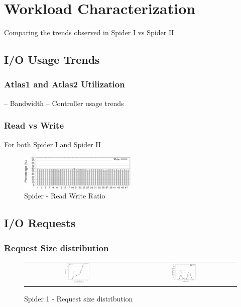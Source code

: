 \section{Workload Characterization}
\label{sec:workloadchar}

Comparing the trends observed in Spider I vs Spider II

\subsection{I/O Usage Trends}
\subsubsection{Atlas1 and Atlas2 Utilization}
-- Bandwidth
-- Controller usage trends

\subsubsection{Read vs Write}
For both Spider I and Spider II

\begin{figure}[!t]
\centering
\includegraphics[width=0.5\textwidth]{./figs/spider1-rd-wr-ratio.eps}
\vspace{-0.1in}
\centering
\caption{Spider - Read Write Ratio}
\label{fig:rwratio}
\end{figure}


\subsection{I/O Requests}
\subsubsection{Request Size distribution}

\begin{figure}[!t]
\centering
\begin{tabular}{cc}
{\includegraphics[width=0.24\textwidth]{./figs/spider1-reqSizeCDF.eps}}&
{\includegraphics[width=0.24\textwidth]{./figs/spider1-reqSizePDF.eps}}\\
\end{tabular}
\vspace{-0.1in}
\centering
\caption{Spider 1 - Request size distribution}
\label{fig:spider1-reqsizedist}
\end{figure}

